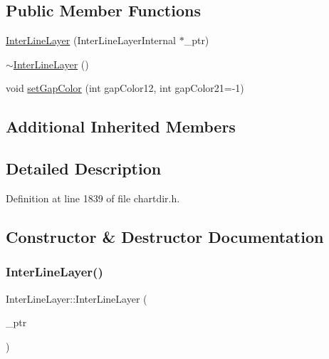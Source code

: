 \subsection*{Public Member Functions}
\begin{DoxyCompactItemize}
\item 
\hyperlink{class_inter_line_layer_aa6ca336057448238464b8e353505fe5e}{Inter\+Line\+Layer} (Inter\+Line\+Layer\+Internal $\ast$\+\_\+ptr)
\item 
\hyperlink{class_inter_line_layer_a27370c8966c328b177b32aae6c0a497b}{$\sim$\+Inter\+Line\+Layer} ()
\item 
void \hyperlink{class_inter_line_layer_af28ea4acbbed5cab5da8f61acc420a45}{set\+Gap\+Color} (int gap\+Color12, int gap\+Color21=-\/1)
\end{DoxyCompactItemize}
\subsection*{Additional Inherited Members}


\subsection{Detailed Description}


Definition at line 1839 of file chartdir.\+h.



\subsection{Constructor \& Destructor Documentation}
\mbox{\label{class_inter_line_layer_aa6ca336057448238464b8e353505fe5e}} 
\subsubsection{\texorpdfstring{Inter\+Line\+Layer()}{InterLineLayer()}}
{\footnotesize\ttfamily Inter\+Line\+Layer\+::\+Inter\+Line\+Layer (\begin{DoxyParamCaption}\item[{Inter\+Line\+Layer\+Internal $\ast$}]{\+\_\+ptr }\end{DoxyParamCaption})\hspace{0.3cm}{\ttfamily [inline]}}



